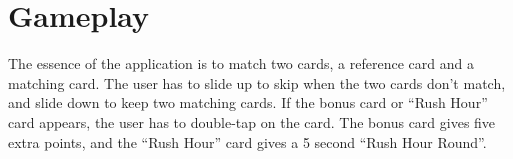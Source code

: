 \section{Gameplay}
The essence of the application is to match two cards, a reference card and a matching card. The user has to slide up to skip when the two cards don’t match, and slide down to keep two matching cards. If the bonus card or “Rush Hour” card appears, the user has to double-tap on the card. The bonus card gives five extra points, and the “Rush Hour” card gives a 5 second “Rush Hour Round”.